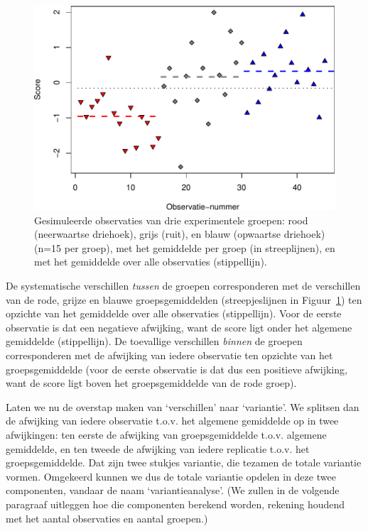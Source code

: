 \documentclass[
]{book}
\begin{document}
\begin{figure}
\centering
\includegraphics{KMS-NL_files/figure-latex/kleurtjes-obs-1.pdf}
\caption{\label{fig:kleurtjes-obs}Gesimuleerde observaties van drie experimentele groepen: rood (neerwaartse driehoek), grijs (ruit), en blauw (opwaartse driehoek) (n=15 per groep), met het gemiddelde per groep (in streeplijnen), en met het gemiddelde over alle observaties (stippellijn).}
\end{figure}

De systematische verschillen \emph{tussen} de groepen corresponderen met de
verschillen van de rode, grijze en blauwe groepsgemiddelden
(streepjeslijnen in
Figuur~\ref{fig:kleurtjes-obs}) ten opzichte van het gemiddelde over
alle observaties (stippellijn). Voor de eerste observatie is dat een
negatieve afwijking, want de score ligt onder het algemene gemiddelde
(stippellijn). De toevallige verschillen \emph{binnen} de groepen
corresponderen met de afwijking van iedere observatie ten opzichte van
het groepsgemiddelde (voor de eerste observatie is dat dus een positieve
afwijking, want de score ligt boven het groepsgemiddelde van de rode
groep).

Laten we nu de overstap maken van `verschillen' naar `variantie'. We
splitsen dan de afwijking van iedere observatie t.o.v. het algemene
gemiddelde op in twee afwijkingen: ten eerste de afwijking van
groepsgemiddelde t.o.v. algemene gemiddelde, en ten tweede de afwijking
van iedere replicatie t.o.v. het groepsgemiddelde. Dat zijn twee stukjes
variantie, die tezamen de totale variantie vormen. Omgekeerd kunnen we
dus de totale variantie opdelen in deze twee componenten, vandaar de
naam `variantieanalyse'. (We zullen in de volgende paragraaf uitleggen
hoe die componenten berekend worden, rekening houdend met het aantal
observaties en aantal groepen.)
\end{document}
